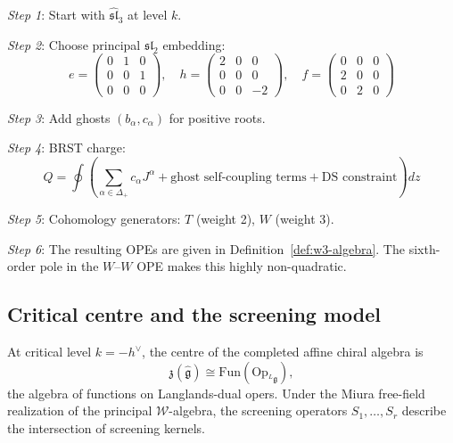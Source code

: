 \begin{example}[\texorpdfstring{$\mathcal{W}_3$}{W3} algebra for \texorpdfstring{$\mathfrak{g} = \mathfrak{sl}_3$}{g = sl3}]
\emph{Step 1}: Start with $\hat{\mathfrak{sl}}_3$ at level $k$.

\emph{Step 2}: Choose principal $\mathfrak{sl}_2$ embedding:
\[
e = \begin{pmatrix} 0 & 1 & 0 \\ 0 & 0 & 1 \\ 0 & 0 & 0 \end{pmatrix}, \quad
h = \begin{pmatrix} 2 & 0 & 0 \\ 0 & 0 & 0 \\ 0 & 0 & -2 \end{pmatrix}, \quad
f = \begin{pmatrix} 0 & 0 & 0 \\ 2 & 0 & 0 \\ 0 & 2 & 0 \end{pmatrix}
\]

\emph{Step 3}: Add ghosts $(b_\alpha, c_\alpha)$ for positive roots.

\emph{Step 4}: BRST charge:
\[
Q = \oint \left( \sum_{\alpha \in \Delta_+} c_\alpha J^\alpha + \text{ghost self-coupling terms} + \text{DS constraint} \right) dz
\]

\emph{Step 5}: Cohomology generators: $T$ (weight 2), $W$ (weight 3).

\emph{Step 6}: The resulting OPEs are given in Definition~\ref{def:w3-algebra}.
The sixth-order pole in the $W$--$W$ OPE makes this highly non-quadratic.
\end{example}

\subsection{Critical centre and the screening model}

\begin{theorem}
\label{thm:feigin-frenkel-bar}
At critical level $k=-h^\vee$, the centre of the completed affine
chiral algebra is
\[
\mathfrak z(\widehat{\mathfrak g})\cong
\mathrm{Fun}(\mathrm{Op}_{{}^L\!\mathfrak g}),
\]
the algebra of functions on Langlands-dual opers.  Under the Miura
free-field realization of the principal $\mathcal W$-algebra, the
screening operators $S_1,\ldots,S_r$ describe the intersection of
screening kernels.
\end{theorem}

